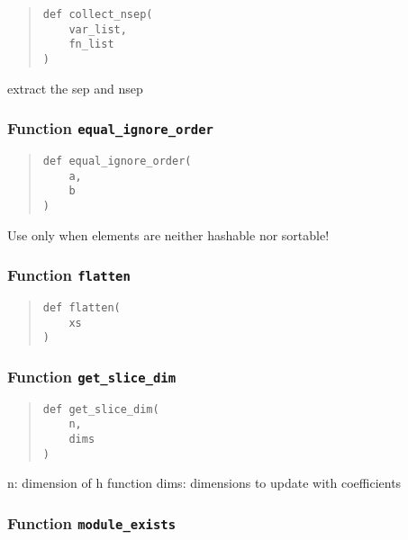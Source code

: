 \documentclass[english,a4paper,oneside]{article}
\begin{document}
\begin{quote}
\begin{verbatim}
def collect_nsep(
    var_list,
    fn_list
)
\end{verbatim}
\end{quote}

extract the sep and nsep

\hypertarget{nBodyCoupling.equal_ignore_order}{%
\subsubsection{\texorpdfstring{Function
\texttt{equal\_ignore\_order}}{Function equal\_ignore\_order}}\label{nBodyCoupling.equal_ignore_order}}

\begin{quote}
\begin{verbatim}
def equal_ignore_order(
    a,
    b
)
\end{verbatim}
\end{quote}

Use only when elements are neither hashable nor sortable!

\hypertarget{nBodyCoupling.flatten}{%
\subsubsection{\texorpdfstring{Function
\texttt{flatten}}{Function flatten}}\label{nBodyCoupling.flatten}}

\begin{quote}
\begin{verbatim}
def flatten(
    xs
)
\end{verbatim}
\end{quote}

\hypertarget{nBodyCoupling.get_slice_dim}{%
\subsubsection{\texorpdfstring{Function
\texttt{get\_slice\_dim}}{Function get\_slice\_dim}}\label{nBodyCoupling.get_slice_dim}}

\begin{quote}
\begin{verbatim}
def get_slice_dim(
    n,
    dims
)
\end{verbatim}
\end{quote}

n: dimension of h function dims: dimensions to update with coefficients

\hypertarget{nBodyCoupling.module_exists}{%
\subsubsection{\texorpdfstring{Function
\texttt{module\_exists}}{Function module\_exists}}\label{nBodyCoupling.module_exists}}
\end{document}
